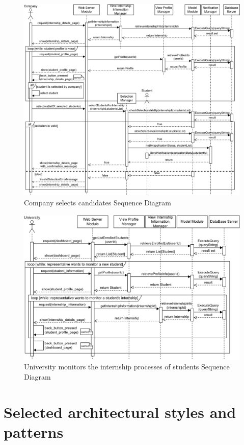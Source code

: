 \begin{figure}[H]
    \centering
    \includegraphics[width=1\textwidth]{Images/Runtime_view/select_SD.png}
    \caption{Company selects candidates Sequence Diagram}
\end{figure}
\begin{figure}[H]
    \centering
    \includegraphics[width=1\textwidth]{Images/Runtime_view/monitor_SD.png}
    \caption{University monitors the internship processes of students Sequence Diagram}
\end{figure}


\section{Selected architectural styles and patterns}\label{sec:selected architectural styles and patterns}
